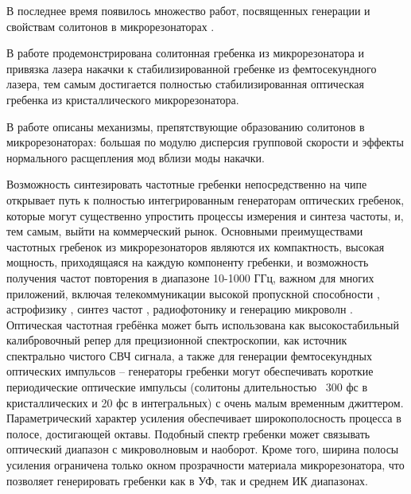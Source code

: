 В последнее время появилось множество работ, посвященных генерации и свойствам солитонов в микрорезонаторах  \cite{Godey2014,Jaramillo2015,Jang2015,Hansson2016,Lamont2013,Saha2013,Matsko2012,DelHaye2014,Wang2014,Bao2014,Chembo2010}.


В работе \cite{Jost2015} продемонстрирована солитонная гребенка из микрорезонатора и привязка лазера накачки к стабилизированной гребенке из фемтосекундного лазера, тем самым достигается полностью стабилизированная оптическая гребенка из кристаллического микрорезонатора.


В работе \cite{HerrPRL2014} описаны механизмы, препятствующие образованию солитонов в микрорезонаторах: большая по модулю дисперсия групповой скорости и эффекты нормального расщепления мод вблизи моды накачки.


Возможность синтезировать частотные гребенки непосредственно на чипе открывает путь к полностью интегрированным генераторам оптических гребенок, которые могут существенно упростить процессы измерения и синтеза частоты, и, тем самым, выйти на коммерческий рынок. Основными преимуществами частотных гребенок из микрорезонаторов являются их компактность, высокая мощность, приходящаяся на каждую компоненту гребенки, и возможность получения частот повторения в диапазоне 10-1000 ГГц, важном для многих приложений, включая телекоммуникации высокой пропускной способности \cite{Pfeifle2014}, астрофизику \cite{Glenday2015}, синтез частот \cite{Ferdous2011}, радиофотонику и генерацию микроволн \cite{Xue2016,Savchenkov2008}. Оптическая частотная гребёнка может быть использована как высокостабильный калибровочный репер для прецизионной спектроскопии, как источник спектрально чистого СВЧ сигнала, а также для генерации фемтосекундных оптических импульсов – генераторы гребенки могут обеспечивать короткие периодические оптические импульсы (солитоны длительностью ~300 фс в кристаллических и 20 фс в интегральных) с очень малым временным джиттером. Параметрический характер усиления обеспечивает широкополосность процесса в полосе, достигающей октавы. Подобный спектр гребенки может связывать оптический диапазон с микроволновым и наоборот. Кроме того, ширина полосы усиления ограничена только окном прозрачности материала микрорезонатора, что позволяет генерировать гребенки как в УФ, так и среднем ИК диапазонах.

